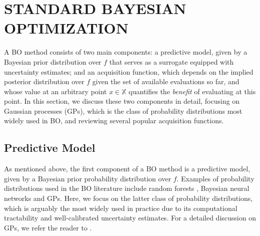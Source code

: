 \documentclass{wscpaperproc}
\newcommand{\X}{\mathbb{X}}
\theoremstyle{wsc}
\begin{document}
\section{STANDARD BAYESIAN OPTIMIZATION} 
\label{sec:standard-BO}
A BO method consists of two main components: a predictive model, given by a Bayesian prior distribution over $f$ that serves as a surrogate equipped with uncertainty estimates; and an acquisition function, which depends on the implied posterior distribution over $f$ given the set of available evaluations so far, and whose value at an arbitrary point $x\in\X$ quantifies the \textit{benefit} of evaluating at this point. In this section, we discuss these two components in detail, focusing on Gaussian processes (GPs), which is the class of probability distributions most widely used in BO, and reviewing several popular acquisition functions. 
\subsection{Predictive Model}
As mentioned above, the first component of a BO method is a predictive model, given by a Bayesian prior probability distribution over $f$. Examples of probability distributions  used in the BO literature include random forests , Bayesian neural networks  and GPs. Here, we focus on the latter class of probability distributions, which is arguably the most widely used in practice due to its computational tractability and well-calibrated uncertainty estimates. For a detailed discussion on GPs, we refer the reader to .
\end{document}
